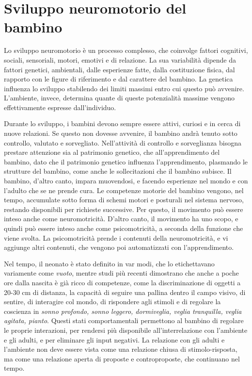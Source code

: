 \mainmatter
\chapter{Sviluppo neuromotorio del bambino}
Lo sviluppo neuromotorio è un processo complesso, che coinvolge fattori cognitivi, sociali, sensoriali, motori,
emotivi e di relazione. La sua variabilità dipende da fattori genetici, ambientali, dalle esperienze fatte,
dalla costituzione fisica, dal rapporto con le figure di riferimento e dal carattere del bambino.
La genetica influenza lo sviluppo stabilendo dei limiti massimi entro cui questo può avvenire. L'ambiente,
invece, determina quante di queste potenzialità massime vengono effettivamente espresse dall'individuo.

Durante lo sviluppo, i bambini devono sempre essere attivi, curiosi e in cerca di nuove relazioni. Se questo non
dovesse avvenire, il bambino andrà tenuto sotto controllo, valutato e sorvegliato.
Nell'attività di controllo e sorveglianza bisogna prestare attenzione sia al patrimonio genetico, che
all'apprendimento del bambino, dato che il patrimonio genetico influenza l'apprendimento, plasmando le strutture
del bambino, come anche le sollecitazioni che il bambino subisce. Il bambino, d'altro canto, impara muovendosi,
e facendo esperienze nel mondo e con l'adulto che se ne prende cura.
Le competenze motorie del bambino vengono, nel tempo, accumulate sotto forma di schemi motori e posturali nel
sistema nervoso, restando disponibili per richieste successive. Per questo, il movimento può essere inteso anche
come neuromotricità.
D'altro canto, il movimento ha uno scopo, e quindi può essere inteso anche come psicomotricità, a seconda della
funzione che viene svolta. La psicomotricità prende i contenuti della neuromotricità, e vi aggiunge altri
contenuti, che vengono poi automatizzati con l'apprendimento.

Nel tempo, il neonato è stato definito in var modi, che lo etichettavano variamente come \textit{vuoto}, mentre
studi più recenti dimostrano che anche a poche ore dalla nascita è già ricco di competenze, come la discriminazione
di oggetti a 20-30 cm di distanza, la capacità di seguire una pallina dentro il campo visivo, di sentire, di
interagire col mondo, di rispondere agli stimoli e di regolare la coscienza in \textit{sonno profondo, sonno
leggero, dormiveglia, veglia tranquilla, veglia agitata, pianto}. Questi stati comportamentali permettono al bambino
di regolare le proprie interazioni, per rendersi più disponibile all'interrelazione con l'ambiente e gli adulti, e
per eliminare gli input negativi. La relazione con gli adulti e l'ambiente non deve essere vista come una relazione
chiusa di stimolo-risposta, ma come una relazione aperta di proposte e controproposte, che continuano nel tempo.

